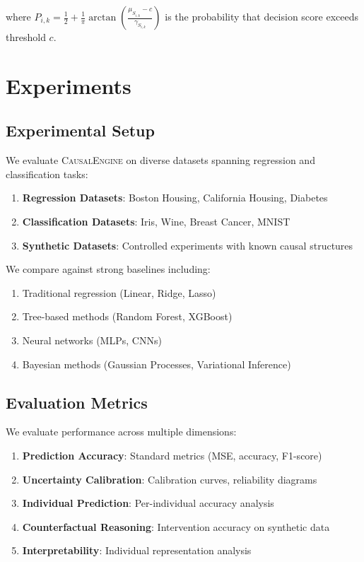 \documentclass[conference]{IEEEtran}
\newcommand{\causalengine}{\textsc{CausalEngine}}
\begin{document}
where $P_{i,k} = \frac{1}{2} + \frac{1}{\pi} \arctan\left(\frac{\mu_{S_{i,k}} - c}{\gamma_{S_{i,k}}}\right)$ is the probability that decision score exceeds threshold $c$.

\section{Experiments}
\label{sec:experiments}

\subsection{Experimental Setup}

We evaluate \causalengine{} on diverse datasets spanning regression and classification tasks:

\begin{enumerate}
\item \textbf{Regression Datasets}: Boston Housing, California Housing, Diabetes
\item \textbf{Classification Datasets}: Iris, Wine, Breast Cancer, MNIST
\item \textbf{Synthetic Datasets}: Controlled experiments with known causal structures
\end{enumerate}

We compare against strong baselines including:
\begin{enumerate}
\item Traditional regression (Linear, Ridge, Lasso)
\item Tree-based methods (Random Forest, XGBoost)
\item Neural networks (MLPs, CNNs)
\item Bayesian methods (Gaussian Processes, Variational Inference)
\end{enumerate}

\subsection{Evaluation Metrics}

We evaluate performance across multiple dimensions:

\begin{enumerate}
\item \textbf{Prediction Accuracy}: Standard metrics (MSE, accuracy, F1-score)
\item \textbf{Uncertainty Calibration}: Calibration curves, reliability diagrams
\item \textbf{Individual Prediction}: Per-individual accuracy analysis
\item \textbf{Counterfactual Reasoning}: Intervention accuracy on synthetic data
\item \textbf{Interpretability}: Individual representation analysis
\end{enumerate}
\end{document}
